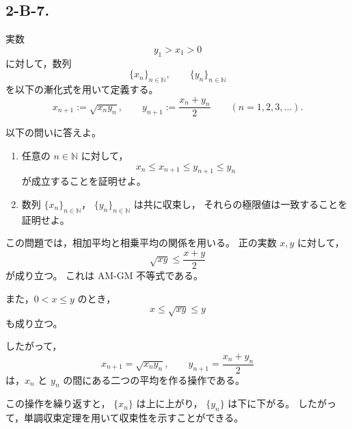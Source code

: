 \subsection{2-B-7.}
\begin{exercise}
	実数
	\[
	y_1>x_1>0
	\]
	に対して，数列
	\[
	\{x_n\}_{n\in\mathbb{N}},
	\qquad
	\{y_n\}_{n\in\mathbb{N}}
	\]
	を以下の漸化式を用いて定義する。
	\[
	x_{n+1}:=\sqrt{x_ny_n},
	\qquad
	y_{n+1}:=\frac{x_n+y_n}{2}
	\qquad
	(n=1,2,3,\ldots).
	\]
	
	以下の問いに答えよ。
	
	\begin{enumerate}
		\item
		任意の \(n\in\mathbb{N}\) に対して，
		\[
		x_n\leq x_{n+1}
		\leq y_{n+1}
		\leq y_n
		\]
		が成立することを証明せよ。
		
		\item
		数列 \(\{x_n\}_{n\in\mathbb{N}}\)，
		\(\{y_n\}_{n\in\mathbb{N}}\) は共に収束し，
		それらの極限値は一致することを証明せよ。
	\end{enumerate}
\end{exercise}

\begin{background}
	この問題では，相加平均と相乗平均の関係を用いる。
	正の実数 \(x,y\) に対して，
	\[
	\sqrt{xy}\leq\frac{x+y}{2}
	\]
	が成り立つ。
	これは AM-GM 不等式である。
	
	また，\(0<x\leq y\) のとき，
	\[
	x\leq\sqrt{xy}\leq y
	\]
	も成り立つ。
	
	したがって，
	\[
	x_{n+1}=\sqrt{x_ny_n},
	\qquad
	y_{n+1}=\frac{x_n+y_n}{2}
	\]
	は，\(x_n\) と \(y_n\) の間にある二つの平均を作る操作である。
	
	この操作を繰り返すと，
	\(\{x_n\}\) は上に上がり，
	\(\{y_n\}\) は下に下がる。
	したがって，単調収束定理を用いて収束性を示すことができる。
\end{background}

